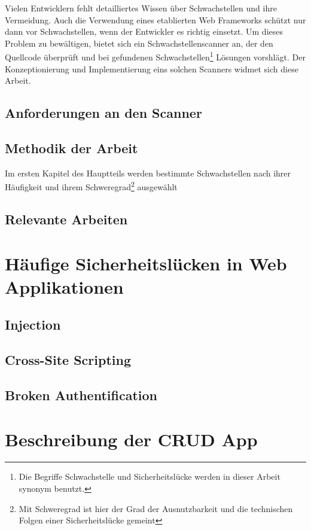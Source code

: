 \documentclass[a4paper,12pt,oneside, bibliography=totoc]
{scrbook}
\begin{document}
Vielen Entwicklern fehlt detailliertes Wissen über Schwachstellen und ihre Vermeidung. Auch die Verwendung eines etablierten Web Frameworks schützt nur dann vor Schwachstellen, wenn der Entwickler es richtig einsetzt. Um dieses Problem zu bewältigen, bietet sich ein Schwachstellenscanner an, der den Quellcode überprüft und bei gefundenen Schwachstellen\footnote{Die Begriffe Schwachstelle und Sicherheitslücke werden in dieser Arbeit synonym benutzt. }  Lösungen vorshlägt. Der Konzeptionierung und Implementierung eins solchen Scanners widmet sich diese Arbeit. 

	
	\section{Anforderungen an den Scanner}
	\section{Methodik der Arbeit}
Im ersten Kapitel des Hauptteils werden bestimmte Schwachstellen nach ihrer Häufigkeit und ihrem Schweregrad\footnote{Mit Schweregrad ist hier der Grad der Ausnutzbarkeit und die technischen Folgen einer Sicherheitslücke gemeint}  ausgewählt
	\section{Relevante Arbeiten}



\chapter{Häufige Sicherheitslücken in Web Applikationen}
	
	\section{Injection}
	
	\section{Cross-Site Scripting}

	\section{Broken Authentification}

\chapter{Beschreibung der CRUD App}
\end{document}
